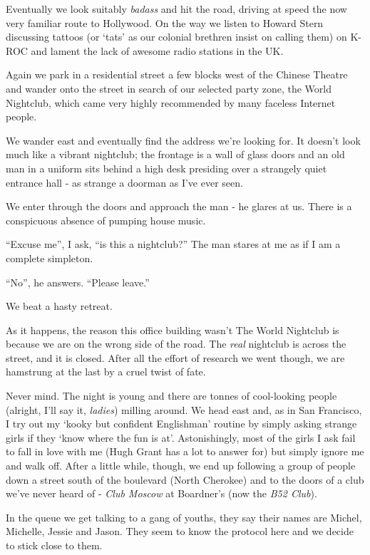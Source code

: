 \documentclass[a5paper,titlepage,11pt]{book}
\begin{document}
Eventually we look suitably \emph{badass} and hit the road, driving at speed the now very familiar route to Hollywood. On the way we listen to Howard Stern discussing tattoos (or `tats' as our colonial brethren insist on calling them) on K-ROC and lament the lack of awesome radio stations in the UK.

Again we park in a residential street a few blocks west of the Chinese Theatre and wander onto the street in search of our selected party zone, the World Nightclub, which came very highly recommended by many faceless Internet people.

We wander east and eventually find the address we're looking for. It doesn't look much like a vibrant nightclub; the frontage is a wall of glass doors and an old man in a uniform sits behind a high desk presiding over a strangely quiet entrance hall - as strange a doorman as I've ever seen.

We enter through the doors and approach the man - he glares at us. There is a conspicuous absence of pumping house music.

``Excuse me'', I ask, ``is this a nightclub?''  The man stares at me as if I am a complete simpleton.

``No'', he answers. ``Please leave.''

We beat a hasty retreat.

As it happens, the reason this office building wasn't The World Nightclub is because we are on the wrong side of the road. The \emph{real} nightclub is across the street, and it is closed. After all the effort of research we went though, we are hamstrung at the last by a cruel twist of fate.

Never mind. The night is young and there are tonnes of cool-looking people (alright, I'll say it, \emph{ladies}) milling around. We head east and, as in San Francisco, I try out my `kooky but confident Englishman' routine by simply asking strange girls if they `know where the fun is at'. Astonishingly, most of the girls I ask fail to fall in love with me (Hugh Grant has a lot to answer for) but simply ignore me and walk off. After a little while, though, we end up following a group of people down a street south of the boulevard (North Cherokee) and to the doors of a club we've never heard of - \emph{Club Moscow} at Boardner's (now the \emph{B52 Club}).

In the queue we get talking to a gang of youths, they say their names are Michel, Michelle, Jessie and Jason. They seem to know the protocol here and we decide to stick close to them.
\end{document}
